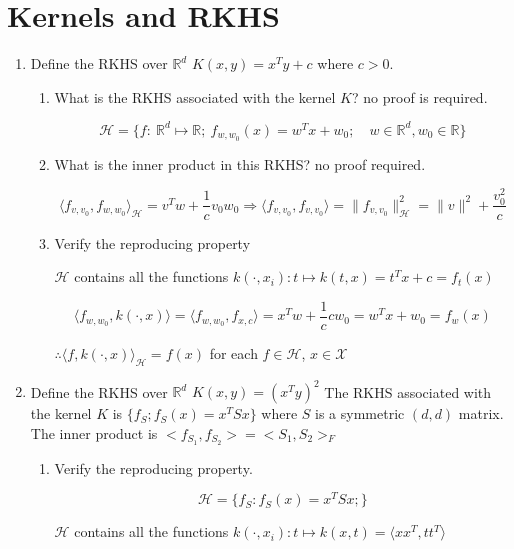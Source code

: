 \documentclass[11pt]{article}
\begin{document}
\section{Kernels and RKHS}
\begin{enumerate}
\item Define the RKHS  over $\mathbb{R}^d$ $K(x,y)=x^Ty+c$ where $c>0$. 

\begin{enumerate}
\item What is the RKHS associated with the kernel $K$? no proof is required. 

$$\mathcal{H} = \{f:\ \mathbb{R}^d\mapsto\mathbb{R};\ f_{w,w_0}(x)=w^Tx+w_0;\quad w\in\mathbb{R}^d,w_0\in\mathbb{R}\}$$





\item What is the inner product in this RKHS? no proof required.  

$$\langle f_{v,v_0},f_{w,w_0}\rangle_{\mathcal{H}}=v^Tw+\frac1cv_0w_0\Rightarrow\langle f_{v,v_0},f_{v,v_0}\rangle=\|f_{v,v_0}\|^2_{\mathcal{H}}=\|v\|^2+\frac{v_0^2}c$$


\item Verify the reproducing property

$\mathcal{H}$ contains all the functions $k(\cdot,x_i): t\mapsto k(t,x)=t^Tx+c=f_t(x)$

$$\langle f_{w,w_0},k(\cdot,x)\rangle=\langle f_{w,w_0},f_{x,c}\rangle=x^Tw+\frac1ccw_0=w^Tx+w_0=f_w(x)$$

$\therefore\langle f,k(\cdot,x)\rangle_{\mathcal{H}}=f(x)$ for each $f\in\mathcal{H}$, $x\in\mathcal{X}$

\end{enumerate}


\item Define the RKHS  over $\mathbb{R}^d$
$K(x,y)=(x^Ty)^2$
The RKHS associated with the kernel $K$ is $\{f_S;f_S(x)=x^T S x\}$ where $S$ is a symmetric $(d,d)$ matrix. The inner product is
$<f_{S_1},f_{S_2}>=<S_1,S_2>_F$



\begin{enumerate}
\item Verify the reproducing property. 

$$\mathcal{H} = \{f_S: f_S(x)=x^TS x;\}$$

$\mathcal{H}$ contains all the functions $k(\cdot,x_i): t\mapsto k(x,t)=\langle xx^T,tt^T\rangle$




\end{enumerate}
\end{enumerate}
\end{document}
